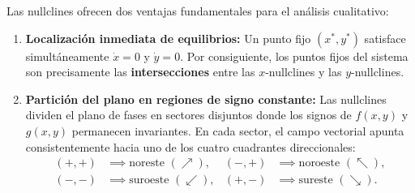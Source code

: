 Las nullclines ofrecen dos ventajas fundamentales para el análisis cualitativo:
\begin{enumerate}
    \item \textbf{Localización inmediata de equilibrios:} Un punto fijo $(x^*, y^*)$ satisface simultáneamente $\dot{x} = 0$ y $\dot{y} = 0$. Por consiguiente, los puntos fijos del sistema son precisamente las \textbf{intersecciones} entre las $x$-nullclines y las $y$-nullclines.
    \item \textbf{Partición del plano en regiones de signo constante:} Las nullclines dividen el plano de fases en sectores disjuntos donde los signos de $f(x,y)$ y $g(x,y)$ permanecen invariantes. En cada sector, el campo vectorial apunta consistentemente hacia uno de los cuatro cuadrantes direccionales:
    \begin{align*}
        (+,+) &\implies \text{noreste } (\nearrow), &
        (-,+) &\implies \text{noroeste } (\nwarrow), \\
        (-,-) &\implies \text{suroeste } (\swarrow), &
        (+,-) &\implies \text{sureste } (\searrow).
    \end{align*}
\end{enumerate}

